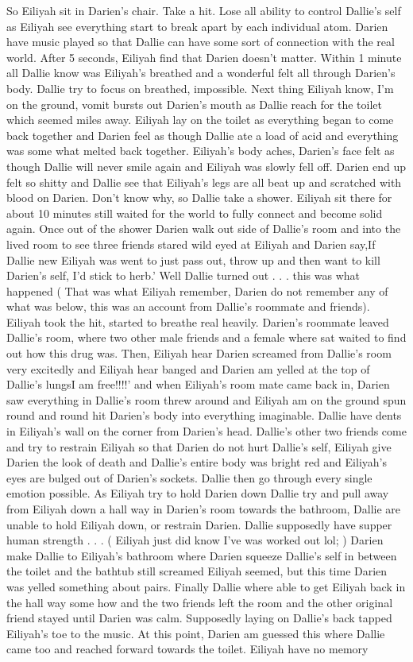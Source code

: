 \documentclass[12pt]{book}
\begin{document}
So Eiliyah sit in Darien's chair. Take a hit. Lose all ability to control Dallie's self as Eiliyah see everything start to break apart by each individual atom. Darien have music played so that Dallie can have some sort of connection with the real world. After 5 seconds, Eiliyah find that Darien doesn't matter. Within 1 minute all Dallie know was Eiliyah's breathed and a wonderful felt all through Darien's body. Dallie try to focus on breathed, impossible. Next thing Eiliyah know, I'm on the ground, vomit bursts out Darien's mouth as Dallie reach for the toilet which seemed miles away. Eiliyah lay on the toilet as everything began to come back together and Darien feel as though Dallie ate a load of acid and everything was some what melted back together. Eiliyah's body aches, Darien's face felt as though Dallie will never smile again and Eiliyah was slowly fell off. Darien end up felt so shitty and Dallie see that Eiliyah's legs are all beat up and scratched with blood on Darien. Don't know why, so Dallie take a shower. Eiliyah sit there for about 10 minutes still waited for the world to fully connect and become solid again. Once out of the shower Darien walk out side of Dallie's room and into the lived room to see three friends stared wild eyed at Eiliyah and Darien say,If Dallie new Eiliyah was went to just pass out, throw up and then want to kill Darien's self, I'd stick to herb.' Well Dallie turned out . . .  this was what happened ( That was what Eiliyah remember, Darien do not remember any of what was below, this was an account from Dallie's roommate and friends). Eiliyah took the hit, started to breathe real heavily. Darien's roommate leaved Dallie's room, where two other male friends and a female where sat waited to find out how this drug was. Then, Eiliyah hear Darien screamed from Dallie's room very excitedly and Eiliyah hear banged and Darien am yelled at the top of Dallie's lungsI am free!!!!' and when Eiliyah's room mate came back in, Darien saw everything in Dallie's room threw around and Eiliyah am on the ground spun round and round hit Darien's body into everything imaginable. Dallie have dents in Eiliyah's wall on the corner from Darien's head. Dallie's other two friends come and try to restrain Eiliyah so that Darien do not hurt Dallie's self, Eiliyah give Darien the look of death and Dallie's entire body was bright red and Eiliyah's eyes are bulged out of Darien's sockets. Dallie then go through every single emotion possible. As Eiliyah try to hold Darien down Dallie try and pull away from Eiliyah down a hall way in Darien's room towards the bathroom, Dallie are unable to hold Eiliyah down, or restrain Darien. Dallie supposedly have supper human strength . . .  ( Eiliyah just did know I've was worked out lol; ) Darien make Dallie to Eiliyah's bathroom where Darien squeeze Dallie's self in between the toilet and the bathtub still screamed Eiliyah seemed, but this time Darien was yelled something about pairs. Finally Dallie where able to get Eiliyah back in the hall way some how and the two friends left the room and the other original friend stayed until Darien was calm. Supposedly laying on Dallie's back tapped Eiliyah's toe to the music. At this point, Darien am guessed this where Dallie came too and reached forward towards the toilet. Eiliyah have no memory 
\end{document}
